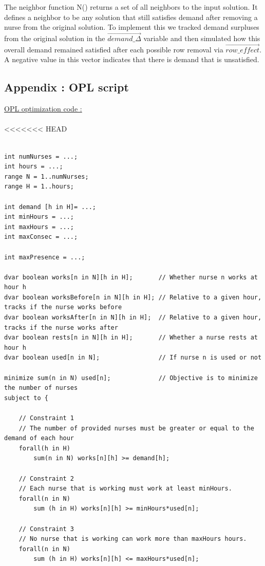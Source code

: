 \documentclass[11pt]{article}
\begin{document}
The neighbor function N() returns a set of all neighbors to the input solution. 
It defines a neighbor to be any solution that still satisfies demand after removing a nurse from the original solution.
To implement this we tracked demand surpluses from the original solution in the $\vec{demand\_\Delta}$ variable and then
simulated how this overall demand remained satisfied after each possible row removal via $\vec{row\_effect}$. A
negative value in this vector indicates that there is demand that is unsatisfied.


\pagebreak
\begin{appendix}

\section{Appendix  : OPL script }
\label{appenOPL}
\underline{OPL optimization code :}\\\\
<<<<<<< HEAD

\tiny{\begin{lstlisting}

int numNurses = ...;
int hours = ...;
range N = 1..numNurses;
range H = 1..hours;

int demand [h in H]= ...;
int minHours = ...;
int maxHours = ...;
int maxConsec = ...;

int maxPresence = ...;

dvar boolean works[n in N][h in H]; 	  // Whether nurse n works at hour h
dvar boolean worksBefore[n in N][h in H]; // Relative to a given hour, tracks if the nurse works before
dvar boolean worksAfter[n in N][h in H];  // Relative to a given hour, tracks if the nurse works after
dvar boolean rests[n in N][h in H]; 	  // Whether a nurse rests at hour h
dvar boolean used[n in N];				  // If nurse n is used or not

minimize sum(n in N) used[n]; 			  // Objective is to minimize the number of nurses 
subject to {

	// Constraint 1
	// The number of provided nurses must be greater or equal to the demand of each hour
	forall(h in H)
		sum(n in N) works[n][h] >= demand[h]; 

	// Constraint 2
	// Each nurse that is working must work at least minHours.
	forall(n in N)
		sum (h in H) works[n][h] >= minHours*used[n];

	// Constraint 3
	// No nurse that is working can work more than maxHours hours.
	forall(n in N)
		sum (h in H) works[n][h] <= maxHours*used[n];


\end{lstlisting}}
\end{appendix}
\end{document}
